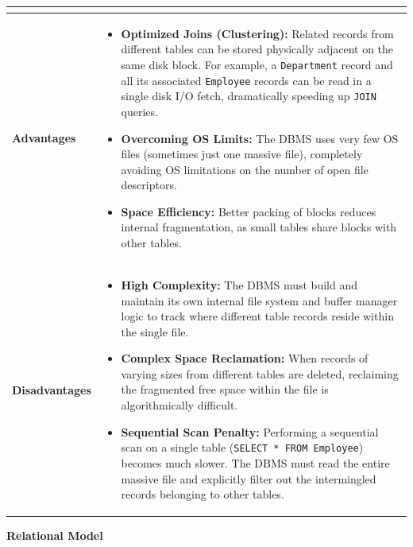 \documentclass[12pt,a3paper]{article}
\newcommand{\subtopic}[2]{%
  \vspace{10pt}
  \noindent\begin{tcolorbox}[colback=#1!8,colframe=#1,boxrule=0.6pt,arc=4pt,
    left=6pt,right=6pt,top=4pt,bottom=4pt]
    \small\bfseries\textcolor{#1}{#2}
  \end{tcolorbox}
  \vspace{2pt}
}
\begin{document}
\begin{enumerate}
\begin{tcolorbox}[enhanced,breakable,ansbox,colback=cA!4,colframe=cA,boxrule=0.8pt,arc=5pt,title={\textbf{Answer}},fonttitle=\bfseries\color{white},colbacktitle=cA]
\renewcommand{\arraystretch}{1.4}
\begin{tabularx}{\textwidth}{@{} >{\bfseries}l X @{}}
\toprule
\multicolumn{2}{c}{\textbf{Multiple Relations in One File}} \\
\midrule
Advantages & 
\vspace{-1.2em}
\begin{itemize}
    \item \textbf{Optimized Joins (Clustering):} Related records from different tables can be stored physically adjacent on the same disk block. For example, a \texttt{Department} record and all its associated \texttt{Employee} records can be read in a single disk I/O fetch, dramatically speeding up \texttt{JOIN} queries.
    \item \textbf{Overcoming OS Limits:} The DBMS uses very few OS files (sometimes just one massive file), completely avoiding OS limitations on the number of open file descriptors.
    \item \textbf{Space Efficiency:} Better packing of blocks reduces internal fragmentation, as small tables share blocks with other tables.
\end{itemize} \\
\midrule
Disadvantages & 
\vspace{-1.2em}
\begin{itemize}
    \item \textbf{High Complexity:} The DBMS must build and maintain its own internal file system and buffer manager logic to track where different table records reside within the single file.
    \item \textbf{Complex Space Reclamation:} When records of varying sizes from different tables are deleted, reclaiming the fragmented free space within the file is algorithmically difficult.
    \item \textbf{Sequential Scan Penalty:} Performing a sequential scan on a single table (\texttt{SELECT * FROM Employee}) becomes much slower. The DBMS must read the entire massive file and explicitly filter out the intermingled records belonging to other tables.
\end{itemize} \\
\bottomrule
\end{tabularx}

\end{tcolorbox}

\end{enumerate}

\subtopic{cA}{Relational Model}
\label{sub:s1-relational}
\end{document}
